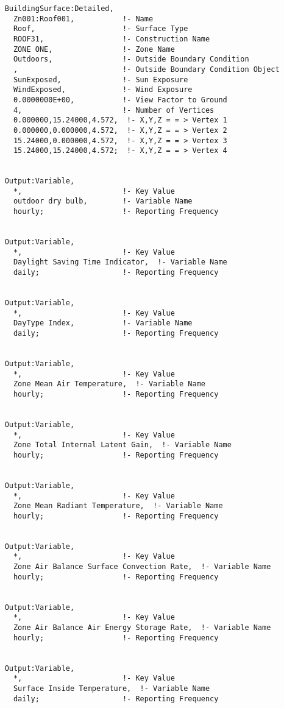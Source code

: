 \begin{lstlisting}
    BuildingSurface:Detailed,
      Zn001:Roof001,           !- Name
      Roof,                    !- Surface Type
      ROOF31,                  !- Construction Name
      ZONE ONE,                !- Zone Name
      Outdoors,                !- Outside Boundary Condition
      ,                        !- Outside Boundary Condition Object
      SunExposed,              !- Sun Exposure
      WindExposed,             !- Wind Exposure
      0.0000000E+00,           !- View Factor to Ground
      4,                       !- Number of Vertices
      0.000000,15.24000,4.572,  !- X,Y,Z = = > Vertex 1
      0.000000,0.000000,4.572,  !- X,Y,Z = = > Vertex 2
      15.24000,0.000000,4.572,  !- X,Y,Z = = > Vertex 3
      15.24000,15.24000,4.572;  !- X,Y,Z = = > Vertex 4


    Output:Variable,
      *,                       !- Key Value
      outdoor dry bulb,        !- Variable Name
      hourly;                  !- Reporting Frequency


    Output:Variable,
      *,                       !- Key Value
      Daylight Saving Time Indicator,  !- Variable Name
      daily;                   !- Reporting Frequency


    Output:Variable,
      *,                       !- Key Value
      DayType Index,           !- Variable Name
      daily;                   !- Reporting Frequency


    Output:Variable,
      *,                       !- Key Value
      Zone Mean Air Temperature,  !- Variable Name
      hourly;                  !- Reporting Frequency


    Output:Variable,
      *,                       !- Key Value
      Zone Total Internal Latent Gain,  !- Variable Name
      hourly;                  !- Reporting Frequency


    Output:Variable,
      *,                       !- Key Value
      Zone Mean Radiant Temperature,  !- Variable Name
      hourly;                  !- Reporting Frequency


    Output:Variable,
      *,                       !- Key Value
      Zone Air Balance Surface Convection Rate,  !- Variable Name
      hourly;                  !- Reporting Frequency


    Output:Variable,
      *,                       !- Key Value
      Zone Air Balance Air Energy Storage Rate,  !- Variable Name
      hourly;                  !- Reporting Frequency


    Output:Variable,
      *,                       !- Key Value
      Surface Inside Temperature,  !- Variable Name
      daily;                   !- Reporting Frequency



\end{lstlisting}

